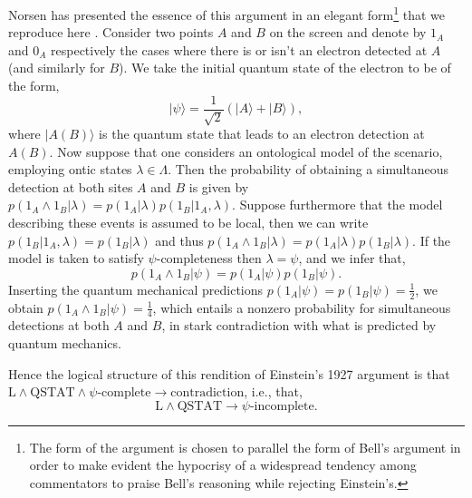 \documentclass[aps,nofootinbib,12pt]{revtex4-2}
\begin{document}
Norsen has presented the essence of this argument in an elegant
form\footnote{The form of the argument is chosen to parallel the
form of Bell's argument in order to make evident the hypocrisy of a
widespread tendency among commentators to praise Bell's reasoning
while rejecting Einstein's.} that we reproduce here
\cite{norsenboxes}. Consider two points $A$ and $B$ on the screen
and denote by $1_{A}$ and $0_{A}$ respectively the cases where there
is or isn't an electron detected at $A$ (and similarly for $B$). We
take the initial quantum state of the electron to be of the form,
\begin{equation}
|\psi\rangle=\frac{1}{\sqrt{2}}(|A\rangle + |B\rangle),
\end{equation}
where $|A(B)\rangle$ is the quantum state that leads to an electron
detection at $A(B)$. Now suppose that one considers an ontological
model of the scenario, employing ontic states $\lambda\in\Lambda$.
Then the probability of obtaining a simultaneous detection at both
sites $A$ and $B$ is given by $p(1_{A}\wedge
{1}_{B}|\lambda)=p(1_{A}|\lambda)p(1_{B}|1_{A},\lambda)$. Suppose
furthermore that the model describing these events is assumed to be
local, then we can write $p(1_{B}|1_{A},\lambda)=p(1_{B}|\lambda)$
and thus $p(1_{A}\wedge
{1}_{B}|\lambda)=p(1_{A}|\lambda)p(1_{B}|\lambda)$. If the model is
taken to satisfy $\psi$-completeness then $\lambda=\psi$, and we
infer that,
\begin{equation}
p(1_{A}\wedge{1}_{B}|\psi)=p(1_{A}|\psi)p(1_{B}|\psi).
\label{probs_local}
\end{equation}
Inserting the quantum mechanical predictions $p(1_{A}|\psi)=p(1_{B}
|\psi)=\frac{1}{2}$, we obtain
$p(1_{A}\wedge{1}_{B}|\psi)=\frac{1}{4}$, which entails a nonzero
probability for simultaneous detections at both $A$ and $B$, in
stark contradiction with what is predicted by quantum mechanics.

Hence the logical structure of this rendition of Einstein's 1927
argument is that
$\text{L}\wedge\text{QSTAT}\wedge\psi\text{-complete}
\rightarrow\text{contradiction}$, i.e., that,
\begin{equation}
\text{L}\wedge\text{QSTAT}\rightarrow\psi\text{-incomplete}.
\label{E1927_logical}
\end{equation}
\end{document}
